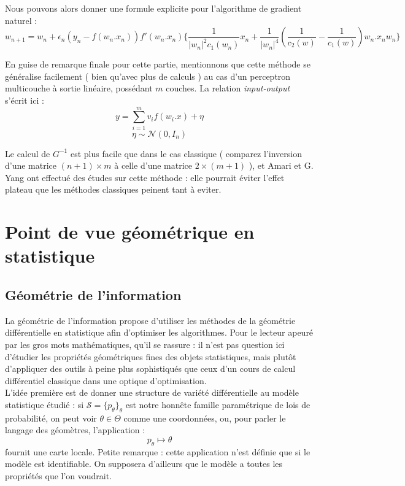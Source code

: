 \documentclass{article}
\theoremstyle{definition}
\begin{document}
Nous pouvons alors donner une formule explicite pour l'algorithme de gradient naturel :
\[w_{n+1}=w_n + \epsilon_n(y_n-f(w_n.x_n))f'(w_n.x_n)
	\{ \frac{1}{|w_n|^2c_1(w_n)}x_n+\frac{1}{|w_n|^4}( \frac{1}{c_2(w)}-\frac{1}{c_1(w)}) w_n.x_n w_n\}\]

En guise de remarque finale pour cette partie, mentionnons que cette méthode se généralise facilement ( bien qu'avec plus de calculs ) au cas d'un perceptron multicouche à sortie linéaire, possédant $m$ couches. 
La relation \textit{input-output} s'écrit ici :
\[y=\sum_{i=1}^m v_i f(w_i.x)+\eta\]
\[\eta \sim \mathcal N(0,I_n)\]

Le calcul de $G^{-1}$ est plus facile que dans le cas classique ( comparez l'inversion d'une matrice $(n+1)\times m$ à celle d'une matrice $2 \times (m+1)$ ), et Amari et G. Yang ont effectué des études sur cette méthode : elle pourrait éviter l'effet plateau que les méthodes classiques peinent tant à eviter.

\section{Point de vue géométrique en statistique}

\subsection{Géométrie de l'information}

La géométrie de l'information propose d'utiliser les méthodes de la géométrie différentielle en statistique afin d'optimiser les algorithmes. Pour le lecteur apeuré par les gros mots mathématiques, qu'il se rassure : il n'est pas question ici d'étudier les propriétés géométriques fines des objets statistiques, mais plutôt d'appliquer des outils à peine plus sophistiqués que ceux d'un cours de calcul différentiel classique dans une optique d'optimisation.\\

 L'idée première est de donner une structure de variété différentielle au modèle statistique étudié : si $\mathcal S = \{p_\theta\}_\theta$ est notre honnête famille paramétrique de lois de probabilité, on peut voir $\theta \in \Theta$ comme une coordonnées, ou, pour parler le langage des géomètres, l'application : \[p_\theta \mapsto \theta\] fournit une carte locale. Petite remarque : cette application n'est définie que si le modèle est identifiable. On supposera d'ailleurs que le modèle a toutes les propriétés que l'on voudrait.\\
\end{document}
